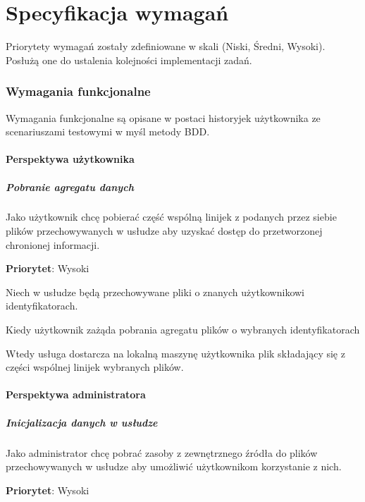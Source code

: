 \documentclass[a4paper,11pt]{article}
\begin{document}
\part{Specyfikacja wymagań}

Priorytety wymagań zostały zdefiniowane w skali (Niski, Średni, Wysoki).
Posłużą one do ustalenia kolejności implementacji zadań.

\section{Wymagania funkcjonalne}
Wymagania funkcjonalne są opisane w postaci historyjek użytkownika ze
scenariuszami testowymi w myśl metody BDD.  

\subsection{Perspektywa użytkownika}
\label{userPerspective}

\subsubsection{Pobranie agregatu danych}
Jako użytkownik chcę pobierać część wspólną linijek z podanych przez
siebie plików przechowywanych w usłudze aby uzyskać dostęp do
przetworzonej chronionej informacji.

\textbf{Priorytet}: Wysoki

Niech w usłudze będą przechowywane pliki o znanych użytkownikowi
identyfikatorach.

Kiedy użytkownik zażąda pobrania agregatu plików o wybranych
identyfikatorach

Wtedy usługa dostarcza na lokalną maszynę użytkownika plik składający
się z części wspólnej linijek wybranych plików.


\subsection{Perspektywa administratora}

\subsubsection{Inicjalizacja danych w usłudze}
Jako administrator chcę pobrać zasoby z zewnętrznego źródła do plików
przechowywanych w usłudze aby umożliwić użytkownikom korzystanie z nich.

\textbf{Priorytet}: Wysoki
\end{document}
